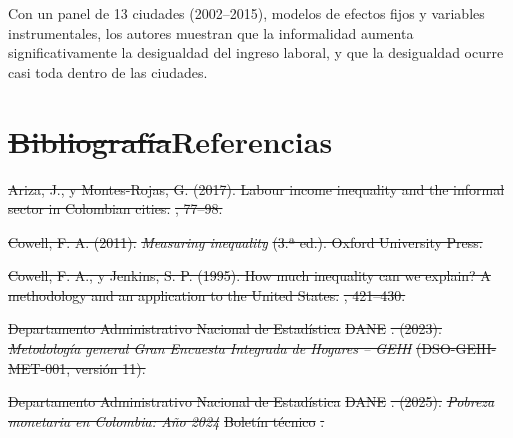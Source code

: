 \documentclass[12pt,letterpaper]{article}
\providecommand{\DIFaddtex}[1]{{\protect\color{BLUE}#1}} %
\providecommand{\DIFdeltex}[1]{{\protect\color{RED}\sout{#1}}} %
\providecommand{\DIFaddtex}[1]{\texorpdfstring{\DIFaddtex{#1}}{#1}} %
\providecommand{\DIFdeltex}[1]{\texorpdfstring{\DIFdeltex{#1}}{}} %
\providecommand{\DIFaddbegin}{}\providecommand{\DIFaddend}{} %
\providecommand{\DIFdelbegin}{}\providecommand{\DIFdelend}{} %
\providecommand{\DIFadd}[1]{\texorpdfstring{\DIFaddtex{#1}}{#1}} %
\providecommand{\DIFdel}[1]{\texorpdfstring{\DIFdeltex{#1}}{}} %
\begin{document}
Con un panel de 13 ciudades (2002--2015), modelos de efectos fijos y variables instrumentales, los autores muestran que la informalidad aumenta significativamente la desigualdad del ingreso laboral, y que la desigualdad ocurre casi toda dentro de las ciudades.


\clearpage
\section{\DIFdelbegin \DIFdel{Bibliografía}\DIFdelend \DIFaddbegin \DIFadd{Referencias}\DIFaddend }

\DIFdelbegin %
\DIFdel{Ariza, J., y Montes-Rojas, G. (2017). Labour income inequality and the informal sector in Colombian cities. }%
\DIFdel{, 77--98. }%

\DIFdel{Cowell, F. A. (2011). }\emph{\DIFdel{Measuring inequality}} %
\DIFdel{(3.ª ed.). Oxford University Press.
}%

\DIFdel{Cowell, F. A., y Jenkins, S. P. (1995). How much inequality can we explain? A methodology and an application to the United States. }%
\DIFdel{, 421--430. }%

\DIFdel{Departamento Administrativo Nacional de Estadística }%
\DIFdel{DANE}%
\DIFdel{. (2023). }\emph{\DIFdel{Metodología general Gran Encuesta Integrada de Hogares -- GEIH}} %
\DIFdel{(DSO-GEIH-MET-001, versión 11). }%

\DIFdel{Departamento Administrativo Nacional de Estadística }%
\DIFdel{DANE}%
\DIFdel{. (2025). }\emph{\DIFdel{Pobreza monetaria en Colombia: Año 2024}} %
\DIFdel{Boletín técnico}%
\DIFdel{. }%
\end{document}
